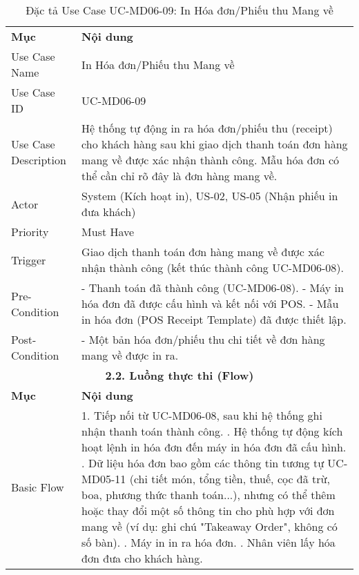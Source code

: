 \begin{longtable}{|m{4cm}|p{11cm}|}
\caption{Đặc tả Use Case UC-MD06-09: In Hóa đơn/Phiếu thu Mang về} \label{tab:uc_md06_09} \\
\hline

\endhead %
\hline
\endfoot %
\hline
\endlastfoot %
\multicolumn{2}{|c|}{\textbf{2.1. Tóm tắt (Summary)}} \\
\hline
\textbf{Mục} & \textbf{Nội dung} \\
\hline
Use Case Name & In Hóa đơn/Phiếu thu Mang về \\
\hline
Use Case ID & UC-MD06-09 \\
\hline
Use Case Description & Hệ thống tự động in ra hóa đơn/phiếu thu (receipt) cho khách hàng sau khi giao dịch thanh toán đơn hàng mang về được xác nhận thành công. Mẫu hóa đơn có thể cần chỉ rõ đây là đơn hàng mang về. \\
\hline
Actor & System (Kích hoạt in), US-02, US-05 (Nhận phiếu in đưa khách) \\
\hline
Priority & Must Have \\
\hline
Trigger & Giao dịch thanh toán đơn hàng mang về được xác nhận thành công (kết thúc thành công UC-MD06-08). \\
\hline
Pre-Condition & - Thanh toán đã thành công (UC-MD06-08). \newline - Máy in hóa đơn đã được cấu hình và kết nối với POS. \newline - Mẫu in hóa đơn (POS Receipt Template) đã được thiết lập. \\
\hline
Post-Condition & - Một bản hóa đơn/phiếu thu chi tiết về đơn hàng mang về được in ra. \\
\hline
\multicolumn{2}{|c|}{\textbf{2.2. Luồng thực thi (Flow)}} \\
\hline
\textbf{Mục} & \textbf{Nội dung} \\
\hline
Basic Flow & 1. Tiếp nối từ UC-MD06-08, sau khi hệ thống ghi nhận thanh toán thành công. \newline 2. Hệ thống tự động kích hoạt lệnh in hóa đơn đến máy in hóa đơn đã cấu hình. \newline 3. Dữ liệu hóa đơn bao gồm các thông tin tương tự UC-MD05-11 (chi tiết món, tổng tiền, thuế, cọc đã trừ, boa, phương thức thanh toán...), nhưng có thể thêm hoặc thay đổi một số thông tin cho phù hợp với đơn mang về (ví dụ: ghi chú "Takeaway Order", không có số bàn). \newline 4. Máy in in ra hóa đơn. \newline 5. Nhân viên lấy hóa đơn đưa cho khách hàng. \\

\end{longtable}
